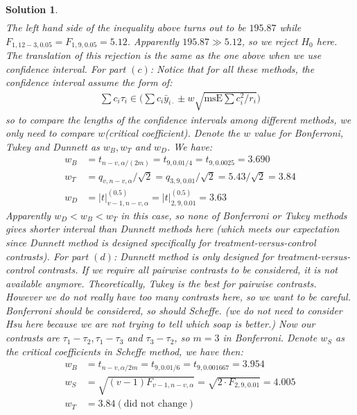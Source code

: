 \documentclass[11pt]{article}
\newtheorem{sol}{Solution}
\begin{document}
\begin{sol}
\begin{align*}
	\end{align*}
	The left hand side of the inequality above turns out to be $195.87$ while $F_{1, 12 - 3, 0.05} = F_{1, 9, 0.05} = 5.12$.\vskip 2mm
	Apparently $195.87 \gg 5.12$, so we reject $H_0$ here. The translation of this rejection is the same as the one above when we use confidence interval.\vskip 2mm
	For part $(c)$:\vskip 2mm
	Notice that for all these methods, the confidence interval assume the form of:
	\begin{align*}
		\sum c_i\tau_i \in \Big(\sum c_i\bar{y}_{i\cdot} \pm w\sqrt{\text{msE}\sum c_i^2/r_i}\Big)
	\end{align*}
	so to compare the lengths of the confidence intervals among different methods, we only need to compare $w$(critical coefficient).\vskip 2mm
	Denote the $w$ value for Bonferroni, Tukey and Dunnett as $w_B, w_T$ and $w_D$. We have:
	\begin{align*}
		w_B &= t_{n - v, \alpha/(2m)} = t_{9, 0.01/4} = t_{9, 0.0025} = 3.690\\
		w_T &= q_{v, n-v, \alpha}/\sqrt{2} = q_{3, 9, 0.01}/\sqrt{2} = 5.43/\sqrt{2} = 3.84\\
		w_{D} &= |t|^{(0.5)}_{v - 1, n - v, \alpha} = |t|^{(0.5)}_{2, 9, 0.01} = 3.63
	\end{align*}
	Apparently $w_D < w_B < w_T$ in this case, so none of Bonferroni or Tukey methods gives shorter interval than Dunnett methods here (which meets our expectation since Dunnett method is designed specifically for treatment-versus-control contrasts).\vskip 2mm
	For part $(d)$:\vskip 2mm
	Dunnett method is only designed for treatment-versus-control contrasts. If we require all pairwise contrasts to be considered, it is not available anymore.\vskip 2mm
	Theoretically, Tukey is the best for pairwise contrasts. However we do not really have too many contrasts here, so we want to be careful. Bonferroni should be considered, so should Scheffe. (we do not need to consider Hsu here because we are not trying to tell which soap is better.) \vskip 2mm
	Now our contrasts are $\tau_1 - \tau_2, \tau_1 - \tau_3$ and $\tau_3 - \tau_2$, so $m = 3$ in Bonferroni. Denote $w_S$ as the critical coefficients in Scheffe method, we have then:
	\begin{align*}
		w_B &=t_{n - v, \alpha/2m} = t_{9, 0.01/6} = t_{9, 0.001667} = 3.954 \\
		w_S &=  \sqrt{(v - 1)F_{v - 1, n - v, \alpha}} = \sqrt{2\cdot F_{2, 9, 0.01}} = 4.005\\
		w_T &= 3.84 (\text{did not change})
	\end{align*}

\end{sol}
\end{document}
